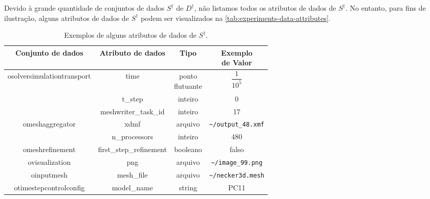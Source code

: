 Devido à grande quantidade de conjuntos de dados \(S^{\dagger}\) de \(D^{\dagger}\), não listamos todos os atributos de dados de \(S^{\dagger}\). No entanto, para fins de ilustração, alguns atributos de dados de \(S^{\dagger}\) podem ser visualizados na \autoref{tab:experiments-data-attributes}.

\begin{table}[htb]
    \centering
    \begin{tabular}{c|c|c|c}
\textbf{Conjunto de dados}                  & \textbf{Atributo de dados} & \textbf{Tipo}   & \makecell{\textbf{Exemplo} \\ \textbf{de Valor}}             \\ \hline
\multirow{3}{*}{osolversimulationtransport} & time                       & \makecell{ponto \\ flutuante} & $\dfrac{1}{10^5}$                                  \\ \cline{2-4}
                                            & t\_step                    & inteiro         & 0                                      \\ \cline{2-4}
                                            & meshwriter\_task\_id       & inteiro         & 17                                     \\ \hline
\multirow{2}{*}{omeshaggregator}            & xdmf                       & arquivo         & \texttt{\textasciitilde/output\_48.xmf}             \\ \cline{2-4}
                                            & n\_processors              & inteiro         & 480                                    \\ \hline
omeshrefinement                             & first\_step\_refinement    & booleano        & falso                                  \\ \hline
ovisualization                              & png                        & arquivo         & \texttt{\textasciitilde/image\_99.png} \\ \hline
oinputmesh                                  & mesh\_file                 & arquivo         & \texttt{\textasciitilde/necker3d.mesh}               \\ \hline
otimestepcontrolconfig                      & model\_name                & string          & PC11                                  
    \end{tabular}
    \caption[Exemplos de alguns atributos de dados de \(S^{\dagger}\)]{Exemplos de alguns atributos de dados de \(S^{\dagger}\).}%
    \label{tab:experiments-data-attributes}
\end{table}

